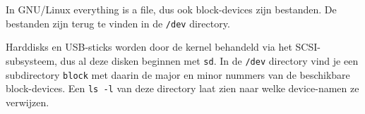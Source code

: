 In GNU/Linux everything is a file, dus ook block-devices zijn bestanden. De bestanden zijn terug te vinden in de \texttt{/dev} directory.

Harddisks en USB-sticks worden door de kernel behandeld via het SCSI-subsysteem, dus al deze disken beginnen met \texttt{sd}. In de \texttt{/dev} directory vind je een subdirectory \texttt{block} met daarin de major en minor nummers van de beschikbare block-devices. Een \texttt{ls -l} van deze directory laat zien naar welke device-namen ze verwijzen.

